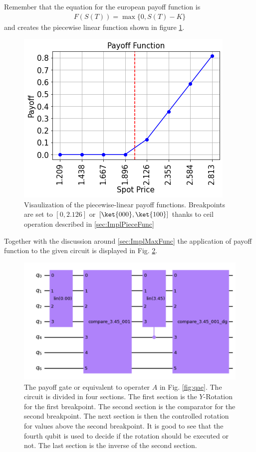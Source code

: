 \documentclass[../main.tex]{subfiles}
\begin{document}
Remember that the equation for the european payoff function is
\begin{align}
    F(S(T)) = \max\{0, S(T) - K\} \label{eq:E_example_european}
\end{align}
and creates the piecewise linear function shown in figure \ref{fig:E_payoff_function}.
\begin{figure}[H]
  \begin{center}
    \includegraphics[width=0.5\linewidth]{../../images/payoff_european.png}
  \end{center}
  \caption{Visaulization of the piecewise-linear payoff functions. Breakpoints are set to $[0, 2.126]$ or $[\ket{000}, \ket{100}]$ 
  thanks to ceil operation described in \ref{sec:ImplPieceFunc}}
  \label{fig:E_payoff_function}
\end{figure}
Together with the discussion around \ref{sec:ImplMaxFunc} the application of payoff function to the given circuit is displayed in
Fig. \ref{fig:E_model_payoff_function}. 
\begin{figure}[H]
  \begin{center}
    \includegraphics[width=\linewidth]{../../images/Agate.png}
  \end{center}
  \caption{The payoff gate or equivalent to operater $A$ in Fig. \ref{fig:qae}. 
  The circuit is divided in four sections. 
  The first section is the $Y$-Rotation for the first breakpoint.
  The second section is the comparator for the second breakpoint. 
  The next section is then the controlled rotation for values above the second breakpoint.
  It is good to see that the fourth qubit is used to decide if the rotation should be executed or not.
  The last section is the inverse of the second section.}
  \label{fig:E_model_payoff_function}
\end{figure}
\end{document}
